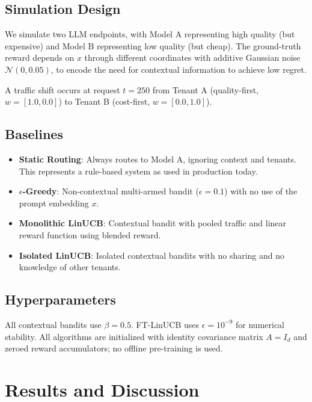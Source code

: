 \documentclass[conference]{IEEEtran}
\begin{document}
\subsection{Simulation Design}
We simulate two LLM endpoints, with Model A representing high quality (but expensive) and Model B representing low quality (but cheap). The ground-truth reward depends on $x$ through different coordinates with additive Gaussian noise $\mathcal{N}(0, 0.05)$, to encode the need for contextual information to achieve low regret.

A traffic shift occurs at request $t = 250$ from Tenant A (quality-first, $w = [1.0, 0.0]$) to Tenant B (cost-first, $w = [0.0, 1.0]$).

\subsection{Baselines}
\begin{itemize}
  \item \textbf{Static Routing}: Always routes to Model A, ignoring context and tenants. This represents a rule-based system as used in production today.
  \item \textbf{$\epsilon$-Greedy}: Non-contextual multi-armed bandit ($\epsilon = 0.1$) with no use of the prompt embedding $x$.
  \item \textbf{Monolithic LinUCB}: Contextual bandit with pooled traffic and linear reward function using blended reward.
  \item \textbf{Isolated LinUCB}: Isolated contextual bandits with no sharing and no knowledge of other tenants.
\end{itemize}

\subsection{Hyperparameters}
All contextual bandits use $\beta = 0.5$. FT-LinUCB uses $\epsilon = 10^{-9}$ for numerical stability. All algorithms are initialized with identity covariance matrix $A = I_d$ and zeroed reward accumulators; no offline pre-training is used.


\section{Results and Discussion}
\end{document}
